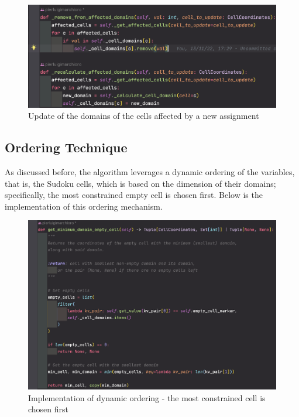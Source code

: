 \begin{figure}[h]
    \centering
    \includegraphics[scale=0.65]{assignment-1/images/cp/domains-4-recalc-remove-doms.png}
    \caption{Update of the domains of the cells affected by a new assignment}
    \label{fig:domain_4}
\end{figure}

\subsection{Ordering Technique}

As discussed before, the algorithm leverages a dynamic ordering of the variables, that is, the Sudoku cells, which is based on the dimension of their domains; specifically, the most constrained empty cell is chosen first. Below is the implementation of this ordering mechanism.

\begin{figure}[h]
    \centering
    \includegraphics[scale=0.5]{assignment-1/images/cp/ordering-1.png}
    \caption{Implementation of dynamic ordering - the most constrained cell is chosen first}
    \label{fig:ordering_1}
\end{figure}



